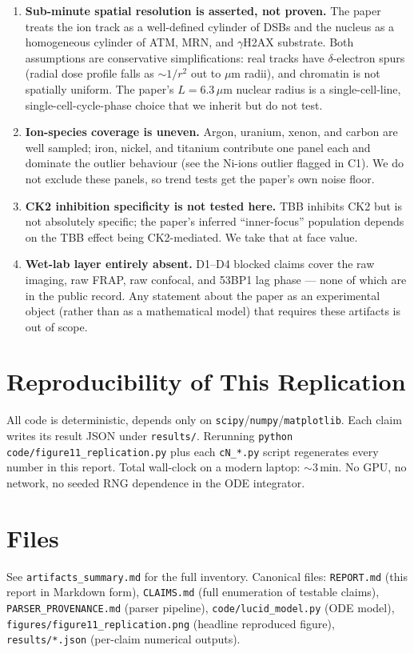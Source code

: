 \documentclass[11pt]{article}
\begin{document}
\begin{enumerate}
\item \textbf{Sub-minute spatial resolution is asserted, not proven.} The paper treats the ion
track as a well-defined cylinder of DSBs and the nucleus as a homogeneous cylinder of ATM,
MRN, and $\gamma$H2AX substrate. Both assumptions are conservative simplifications: real
tracks have $\delta$-electron spurs (radial dose profile falls as $\sim 1/r^2$ out to
$\mu$m radii), and chromatin is not spatially uniform. The paper's $L=6.3\,\mu$m nuclear
radius is a single-cell-line, single-cell-cycle-phase choice that we inherit but do not test.

\item \textbf{Ion-species coverage is uneven.} Argon, uranium, xenon, and carbon are well
sampled; iron, nickel, and titanium contribute one panel each and dominate the outlier
behaviour (see the Ni-ions outlier flagged in C1). We do not exclude these panels, so trend
tests get the paper's own noise floor.

\item \textbf{CK2 inhibition specificity is not tested here.} TBB inhibits CK2 but is not
absolutely specific; the paper's inferred ``inner-focus'' population depends on the TBB
effect being CK2-mediated. We take that at face value.

\item \textbf{Wet-lab layer entirely absent.} D1--D4 blocked claims cover the raw imaging,
raw FRAP, raw confocal, and 53BP1 lag phase --- none of which are in the public record.
Any statement about the paper as an experimental object (rather than as a mathematical model)
that requires these artifacts is out of scope.
\end{enumerate}



\section{Reproducibility of This Replication}

All code is deterministic, depends only on \texttt{scipy}/\texttt{numpy}/\texttt{matplotlib}.
Each claim writes its result JSON under \texttt{results/}. Rerunning
\verb|python code/figure11_replication.py| plus each \verb|cN_*.py| script regenerates every
number in this report. Total wall-clock on a modern laptop: $\sim$3\,min. No GPU, no network,
no seeded RNG dependence in the ODE integrator.

\section*{Files}

See \texttt{artifacts\_summary.md} for the full inventory. Canonical files:
\texttt{REPORT.md} (this report in Markdown form),
\texttt{CLAIMS.md} (full enumeration of testable claims),
\texttt{PARSER\_PROVENANCE.md} (parser pipeline),
\texttt{code/lucid\_model.py} (ODE model),
\texttt{figures/figure11\_replication.png} (headline reproduced figure),
\texttt{results/*.json} (per-claim numerical outputs).
\end{document}
